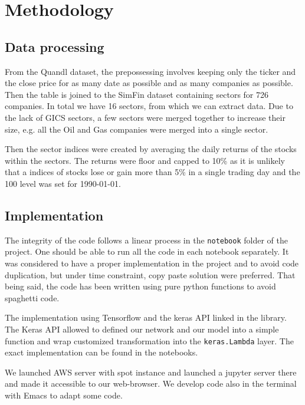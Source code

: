 \documentclass[a4paper,twoside]{article}
\begin{document}
\section{Methodology}
\label{sec:org028bbfd}

\subsection{Data processing}
\label{sec:orga6824d6}

From the Quandl dataset, the prepossessing involves keeping only the ticker
and the close price for as many date as possible and as many companies as
possible. Then the table is joined to the SimFin dataset containing sectors
for 726 companies. In total we have 16 sectors, from which we can extract
data. Due to the lack of GICS sectors, a few sectors were merged together to
increase their size, e.g. all the Oil and Gas companies were merged into a
single sector.

Then the sector indices were created by averaging the daily returns of the
stocks within the sectors. The returns were floor and capped to 10\% as it is
unlikely that a indices of stocks lose or gain more than 5\% in a single
trading day and the 100 level was set for 1990-01-01.

\subsection{Implementation}
\label{sec:org529cc81}

The integrity of the code follows a linear process in the \texttt{notebook} folder
of the project. One should be able to run all the code in each notebook
separately. It was considered to have a proper implementation in the project
and to avoid code duplication, but under time constraint, copy paste solution
were preferred. That being said, the code has been written using pure python
functions to avoid spaghetti code.

The implementation using Tensorflow and the keras API linked in the library.
The Keras API allowed to defined our network and our model into a simple
function and wrap customized transformation into the \texttt{keras.Lambda} layer.
The exact implementation can be found in the notebooks.

We launched AWS server with spot instance and launched a jupyter server there
and made it accessible to our web-browser. We develop code also in the
terminal with Emacs to adapt some code. 
\end{document}
